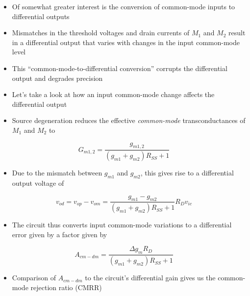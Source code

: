 \documentclass[11pt]{article}
\providecommand{\tightlist}{%
      \setlength{\itemsep}{0pt}\setlength{\parskip}{0pt}}
\begin{document}
    \begin{itemize}
\item
  Of somewhat greater interest is the conversion of common-mode inputs
  to differential outputs
\item
  Mismatches in the threshold voltages and drain currents of \(M_1\) and
  \(M_2\) result in a differential output that varies with changes in
  the input common-mode level
\item
  This ``common-mode-to-differential conversion'' corrupts the
  differential output and degrades precision
\item
  Let's take a look at how an input common-mode change affects the
  differential output
\end{itemize}

    \begin{itemize}
\tightlist
\item
  Source degeneration reduces the effective \emph{common-mode}
  transconductances of \(M_1\) and \(M_2\) to
\end{itemize}

\begin{equation} 
G_{m1,2} = \dfrac{g_{m1,2}}{(g_{m1} + g_{m2})R_{SS} + 1}
\end{equation}

\begin{itemize}
\tightlist
\item
  Due to the mismatch between \(g_{m1}\) and \(g_{m2}\), this gives rise
  to a differential output voltage of
\end{itemize}

\begin{equation}
v_{od} = v_{op} - v_{om} = \dfrac{g_{m1} - g_{m2}}{(g_{m1} + g_{m2})R_{SS} + 1}R_D v_{ic}
\end{equation}

\begin{itemize}
\tightlist
\item
  The circuit thus converts input common-mode variations to a
  differential error given by a factor given by
\end{itemize}

\begin{equation}
A_{cm-dm} = \dfrac{\Delta g_m R_D}{(g_{m1} + g_{m2})R_{SS} + 1}
\end{equation}

\begin{itemize}
\tightlist
\item
  Comparison of \(A_{cm-dm}\) to the circuit's differential gain gives
  us the common-mode rejection ratio (CMRR)
\end{itemize}
\end{document}
